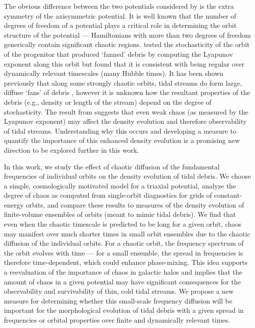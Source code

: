 \documentclass[letterpaper,12pt,preprint]{aastex}
\begin{document}
The obvious difference between the two potentials considered by \citet{pearson15} is the extra symmetry of the axisymmetric potential. It is well known that the number of degrees of freedom of a potential plays a critical role in determining the orbit structure of the potential --- Hamiltonians with more than two degrees of freedom generically contain significant chaotic regions. \citet{pearson15} tested the stochasticity of the orbit of the progenitor that produced `fanned' debris by computing the Lyapunov exponent along this orbit but found that it is consistent with being regular over dynamically relevant timescales (many Hubble times). It has been shown previously that along some strongly chaotic orbits, tidal streams do form large, diffuse `fans' of debris \citep[e.g.,][]{fardal14}, however it is unknown how the resultant properties of the debris (e.g., density or length of the stream) depend on the degree of stochasticity. The result from \citet{pearson15} suggests that even weak chaos (as measured by the Lyapunov exponent) may affect the density evolution and therefore observability of tidal streams. Understanding why this occurs and developing a measure to quantify the importance of this enhanced density evolution is a promising new direction to be explored further in this work.

In this work, we study the effect of chaotic diffusion of the fundamental frequencies of individual orbits on the density evolution of tidal debris. We choose a simple, cosmologically motivated model for a triaxial potential, analyze the degree of chaos as computed from single-orbit diagnostics for grids of constant-energy orbits, and compare these results to measures of the density evolution of finite-volume ensembles of orbits (meant to mimic tidal debris). We find that even when the chaotic timescale is predicted to be long for a given orbit, chaos may manifest over much shorter times in small orbit ensembles due to the chaotic diffusion of the individual orbits. For a chaotic orbit, the frequency spectrum of the orbit evolves with time --- for a small ensemble, the spread in frequencies is therefore time-dependent, which could enhance phase-mixing. This idea supports a reevaluation of the importance of chaos in galactic halos and implies that the amount of chaos in a given potential may have significant consequences for the observability and survivability of thin, cold tidal streams. We propose a new measure for determining whether this small-scale frequency diffusion will be important for the morphological evolution of tidal debris with a given spread in frequencies or orbital properties over finite and dynamically relevant times.
\end{document}
